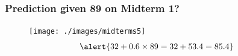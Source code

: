 \begin{frame}
\frametitle{Prediction given 89 on Midterm 1? }
\begin{figure}
	\texttt{[image: ./images/midterms5]}
	$$\alert{32 + 0.6 \times 89 = 32 + 53.4 = 85.4}$$
\end{figure}
\end{frame}

